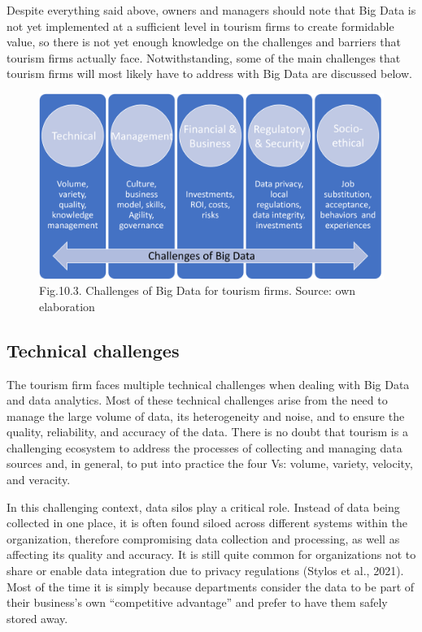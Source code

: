\documentclass[
  letterpaper,
  DIV=11,
  numbers=noendperiod]{scrreprt}
\begin{document}
Despite everything said above, owners and managers should note that Big
Data is not yet implemented at a sufficient level in tourism firms to
create formidable value, so there is not yet enough knowledge on the
challenges and barriers that tourism firms actually face.
Notwithstanding, some of the main challenges that tourism firms will
most likely have to address with Big Data are discussed below.

\begin{figure}

{\centering \includegraphics[width=7.29167in,height=\textheight]{img/fig13.png}

}

\caption{Fig.10.3. Challenges of Big Data for tourism firms. Source: own
elaboration}

\end{figure}

\hypertarget{technical-challenges}{%
\subsection{Technical challenges}\label{technical-challenges}}

The tourism firm faces multiple technical challenges when dealing with
Big Data and data analytics. Most of these technical challenges arise
from the need to manage the large volume of data, its heterogeneity and
noise, and to ensure the quality, reliability, and accuracy of the data.
There is no doubt that tourism is a challenging ecosystem to address the
processes of collecting and managing data sources and, in general, to
put into practice the four Vs: volume, variety, velocity, and veracity.

In this challenging context, data silos play a critical role. Instead of
data being collected in one place, it is often found siloed across
different systems within the organization, therefore compromising data
collection and processing, as well as affecting its quality and
accuracy. It is still quite common for organizations not to share or
enable data integration due to privacy regulations (Stylos et al.,
2021). Most of the time it is simply because departments consider the
data to be part of their business's own ``competitive advantage'' and
prefer to have them safely stored away.
\end{document}
